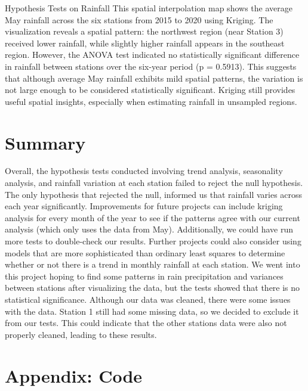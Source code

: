 \documentclass[12pt]{article}
\theoremstyle{definition}
\begin{document}
\begin{section}{Hypothesis Tests on Rainfall}
This spatial interpolation map shows the average May rainfall across the six stations from 2015 to 2020 using Kriging. The visualization reveals a spatial pattern: the northwest region (near Station 3) received lower rainfall, while slightly higher rainfall appears in the southeast region. However, the ANOVA test indicated no statistically significant difference in rainfall between stations over the six-year period (p = 0.5913). This suggests that although average May rainfall exhibits mild spatial patterns, the variation is not large enough to be considered statistically significant. Kriging still provides useful spatial insights, especially when estimating rainfall in unsampled regions.


\end{section}
\section{Summary}
Overall, the hypothesis tests conducted involving trend analysis, seasonality analysis, and rainfall variation at each station failed to reject the null hypothesis. The only hypothesis that rejected the null, informed us that rainfall varies across each year significantly. Improvements for future projects can include kriging analysis for every month of the year to see if the patterns agree with our current analysis (which only uses the data from May). Additionally, we could have run more tests to double-check our results. Further projects could also consider using models that are more sophisticated than ordinary least squares to determine whether or not there is a trend in monthly rainfall at each station. We went into this project hoping to find some patterns in rain precipitation and variances between stations after visualizing the data, but the tests showed that there is no statistical significance. Although our data was cleaned, there were some issues with the data. Station 1 still had some missing data, so we decided to exclude it from our tests. This could indicate that the other stations data were also not properly cleaned, leading to these results.


\section{Appendix: Code}
\end{document}
